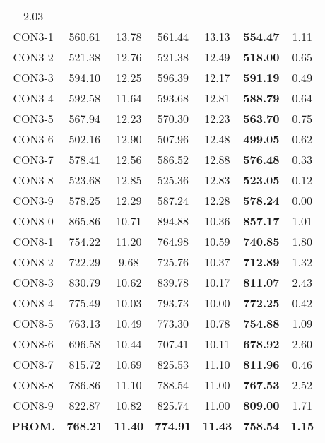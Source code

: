 \begin{table}[ht]
\begin{tabular}{c c c c c c c}
2.03\\CON3-1 & 560.61 & 13.78 & 
561.44 & 13.13 & \bf{554.47} & 
1.11\\CON3-2 & 521.38 & 12.76 & 
521.38 & 12.49 & \bf{518.00} & 
0.65\\CON3-3 & 594.10 & 12.25 & 
596.39 & 12.17 & \bf{591.19} & 
0.49\\CON3-4 & 592.58 & 11.64 & 
593.68 & 12.81 & \bf{588.79} & 
0.64\\CON3-5 & 567.94 & 12.23 & 
570.30 & 12.23 & \bf{563.70} & 
0.75\\CON3-6 & 502.16 & 12.90 & 
507.96 & 12.48 & \bf{499.05} & 
0.62\\CON3-7 & 578.41 & 12.56 & 
586.52 & 12.88 & \bf{576.48} & 
0.33\\CON3-8 & 523.68 & 12.85 & 
525.36 & 12.83 & \bf{523.05} & 
0.12\\CON3-9 & 578.25 & 12.29 & 
587.24 & 12.28 & \bf{578.24} & 
0.00\\CON8-0 & 865.86 & 10.71 & 
894.88 & 10.36 & \bf{857.17} & 
1.01\\CON8-1 & 754.22 & 11.20 & 
764.98 & 10.59 & \bf{740.85} & 
1.80\\CON8-2 & 722.29 & 9.68 & 
725.76 & 10.37 & \bf{712.89} & 
1.32\\CON8-3 & 830.79 & 10.62 & 
839.78 & 10.17 & \bf{811.07} & 
2.43\\CON8-4 & 775.49 & 10.03 & 
793.73 & 10.00 & \bf{772.25} & 
0.42\\CON8-5 & 763.13 & 10.49 & 
773.30 & 10.78 & \bf{754.88} & 
1.09\\CON8-6 & 696.58 & 10.44 & 
707.41 & 10.11 & \bf{678.92} & 
2.60\\CON8-7 & 815.72 & 10.69 & 
825.53 & 11.10 & \bf{811.96} & 
0.46\\CON8-8 & 786.86 & 11.10 & 
788.54 & 11.00 & \bf{767.53} & 
2.52\\CON8-9 & 822.87 & 10.82 & 
825.74 & 11.00 & \bf{809.00} & 
1.71\\\bf{PROM.} & 
\bf{768.21} & \bf{11.40} & \bf{774.91} & \bf{11.43} & \bf{758.54} & \bf{1.15}\\[1ex]\hline
\end{tabular}
\label{table:nonlin}
\end{table} \clearpage
